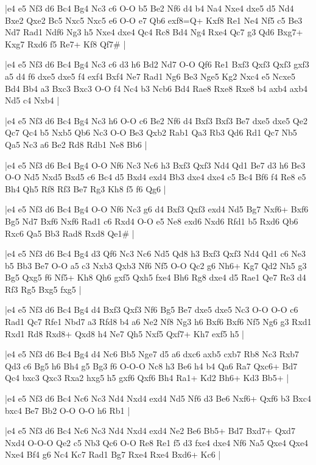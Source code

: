 \whitename{}
\blackname{}
\makegametitle
|e4 e5 Nf3 d6 Bc4 Bg4 Nc3 c6 O-O b5 Be2 Nf6 d4 b4 Na4 Nxe4 dxe5 d5 Nd4 Bxe2 Qxe2 Bc5 Nxc5 Nxc5 e6 O-O e7 Qb6 exf8=Q+ Kxf8 Re1 Ne4 Nf5 c5 Be3 Nd7 Rad1 Ndf6 Ng3 h5 Nxe4 dxe4 Qc4 Rc8 Bd4 Ng4 Rxe4 Qc7 g3 Qd6 Bxg7+ Kxg7 Rxd6 f5 Re7+ Kf8 Qf7\#  |

\whitename{}
\blackname{}
\makegametitle
|e4 e5 Nf3 d6 Bc4 Bg4 Nc3 c6 d3 h6 Bd2 Nd7 O-O Qf6 Re1 Bxf3 Qxf3 Qxf3 gxf3 a5 d4 f6 dxe5 dxe5 f4 exf4 Bxf4 Ne7 Rad1 Ng6 Be3 Nge5 Kg2 Nxc4 e5 Ncxe5 Bd4 Bb4 a3 Bxc3 Bxc3 O-O f4 Nc4 b3 Ncb6 Bd4 Rae8 Rxe8 Rxe8 b4 axb4 axb4 Nd5 c4 Nxb4  |

\whitename{}
\blackname{}
\makegametitle
|e4 e5 Nf3 d6 Bc4 Bg4 Nc3 h6 O-O c6 Be2 Nf6 d4 Bxf3 Bxf3 Be7 dxe5 dxe5 Qe2 Qc7 Qc4 b5 Nxb5 Qb6 Nc3 O-O Be3 Qxb2 Rab1 Qa3 Rb3 Qd6 Rd1 Qc7 Nb5 Qa5 Nc3 a6 Be2 Rd8 Rdb1 Ne8 Bb6  |

\whitename{}
\blackname{}
\makegametitle
|e4 e5 Nf3 d6 Bc4 Bg4 O-O Nf6 Nc3 Nc6 h3 Bxf3 Qxf3 Nd4 Qd1 Be7 d3 h6 Be3 O-O Nd5 Nxd5 Bxd5 c6 Bc4 d5 Bxd4 exd4 Bb3 dxe4 dxe4 c5 Bc4 Bf6 f4 Re8 e5 Bh4 Qh5 Rf8 Rf3 Be7 Rg3 Kh8 f5 f6 Qg6  |

\whitename{}
\blackname{}
\makegametitle
|e4 e5 Nf3 d6 Bc4 Bg4 O-O Nf6 Nc3 g6 d4 Bxf3 Qxf3 exd4 Nd5 Bg7 Nxf6+ Bxf6 Bg5 Nd7 Bxf6 Nxf6 Rad1 c6 Rxd4 O-O e5 Ne8 exd6 Nxd6 Rfd1 b5 Rxd6 Qb6 Rxc6 Qa5 Bb3 Rad8 Rxd8 Qe1\#  |

\whitename{}
\blackname{}
\makegametitle
|e4 e5 Nf3 d6 Bc4 Bg4 d3 Qf6 Nc3 Nc6 Nd5 Qd8 h3 Bxf3 Qxf3 Nd4 Qd1 c6 Ne3 b5 Bb3 Be7 O-O a5 c3 Nxb3 Qxb3 Nf6 Nf5 O-O Qc2 g6 Nh6+ Kg7 Qd2 Nh5 g3 Bg5 Qxg5 f6 Nf5+ Kh8 Qh6 gxf5 Qxh5 fxe4 Bh6 Rg8 dxe4 d5 Rae1 Qe7 Re3 d4 Rf3 Rg5 Bxg5 fxg5  |

\whitename{}
\blackname{}
\makegametitle
|e4 e5 Nf3 d6 Bc4 Bg4 d4 Bxf3 Qxf3 Nf6 Bg5 Be7 dxe5 dxe5 Nc3 O-O O-O c6 Rad1 Qc7 Rfe1 Nbd7 a3 Rfd8 b4 a6 Ne2 Nf8 Ng3 h6 Bxf6 Bxf6 Nf5 Ng6 g3 Rxd1 Rxd1 Rd8 Rxd8+ Qxd8 h4 Ne7 Qh5 Nxf5 Qxf7+ Kh7 exf5 h5  |

\whitename{}
\blackname{}
\makegametitle
|e4 e5 Nf3 d6 Bc4 Bg4 d4 Nc6 Bb5 Nge7 d5 a6 dxc6 axb5 cxb7 Rb8 Nc3 Rxb7 Qd3 c6 Bg5 h6 Bh4 g5 Bg3 f6 O-O-O Nc8 h3 Be6 h4 b4 Qa6 Ra7 Qxc6+ Bd7 Qc4 bxc3 Qxc3 Rxa2 hxg5 h5 gxf6 Qxf6 Bh4 Ra1+ Kd2 Bh6+ Kd3 Bb5+  |

\whitename{}
\blackname{}
\makegametitle
|e4 e5 Nf3 d6 Bc4 Nc6 Nc3 Nd4 Nxd4 exd4 Nd5 Nf6 d3 Be6 Nxf6+ Qxf6 b3 Bxc4 bxc4 Be7 Bb2 O-O O-O h6 Rb1  |

\whitename{}
\blackname{}
\makegametitle
|e4 e5 Nf3 d6 Bc4 Nc6 Nc3 Nd4 Nxd4 exd4 Ne2 Be6 Bb5+ Bd7 Bxd7+ Qxd7 Nxd4 O-O-O Qe2 c5 Nb3 Qc6 O-O Re8 Re1 f5 d3 fxe4 dxe4 Nf6 Na5 Qxe4 Qxe4 Nxe4 Bf4 g6 Nc4 Kc7 Rad1 Bg7 Rxe4 Rxe4 Bxd6+ Kc6  |

